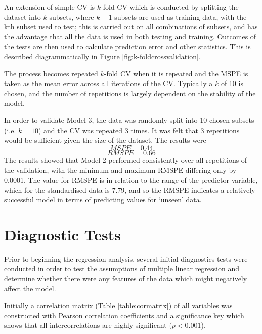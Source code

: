 \documentclass[11pt,a4paper]{report}
\begin{document}
An extension of simple CV is $k$-fold CV which is conducted by splitting the dataset into $k$ subsets, where $k-1$ subsets are used as training data, with the kth subset used to test; this is carried out on all combinations of subsets, and has the advantage that all the data is used in both testing and training. Outcomes of the tests are then used to calculate prediction error and other statistics. This is described diagrammatically in Figure \ref{fig:k-foldcrossvalidation}. 

The process becomes repeated $k$-fold CV when it is repeated and the \ac{MSPE} is taken as the mean error across all iterations of the CV. Typically a $k$ of 10 is chosen, and the number of repetitions is largely dependent on the stability of the model. 

In order to validate Model 3, the data was randomly split into 10 chosen subsets (i.e. $k=10$)  and the CV was repeated 3 times. It was felt that 3 repetitions would be sufficient given the size of the dataset. The results were
\[ MSPE = 0.44\] 
\[RMSPE =  0.66 \]
The results showed that Model 2 performed consistently over all repetitions of the validation, with the minimum and maximum RMSPE differing only by 0.0001. The value for RMSPE is in relation to the range of the predictor variable, which for the standardised data is 7.79, and so the RMSPE indicates a relatively successful model in terms of predicting values for `unseen' data. 

\section{Diagnostic Tests} \label{RegDiagnostics}
Prior to beginning the regression analysis, several initial diagnostics tests were conducted in order to test the assumptions of multiple linear regression and determine whether there were any features of the data which might negatively affect the model. 

Initially a correlation matrix (Table \ref{table:cormatrix}) of all variables was constructed with Pearson correlation coefficients and a significance key which shows that all intercorrelations are highly significant $(p < 0.001$).
\end{document}
